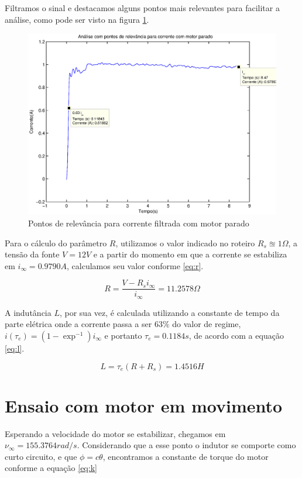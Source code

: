 \documentclass{article}
\begin{document}
Filtramos o sinal e destacamos alguns pontos mais relevantes para facilitar a análise, como pode ser visto na figura \ref{fig:riseI}.
\begin{figure}[H]
	\centering
	\includegraphics[width=0.8\linewidth]{../riseI}
	\caption{Pontos de relevância para corrente filtrada com motor parado}
	\label{fig:riseI}
\end{figure}

Para o cálculo do parâmetro $R$, utilizamos o valor indicado no roteiro\cite{bb:roteiro} $R_s\approxeq1 \Omega$, a tensão da fonte $V=12 V$ e a partir do momento em que a corrente se estabiliza em $i_\infty=0.9790 A$, calculamos seu valor conforme \ref{eq:r}.

\begin{equation}
\label{eq:r}
R = \frac{V-R_si_\infty}{i_\infty}=11.2578\Omega
\end{equation}

A indutância $L$, por sua vez, é calculada utilizando a constante de tempo da parte elétrica onde a corrente passa a ser $63\%$ do valor de regime, $i(\tau_e)=(1-\exp^{-1})i_\infty$ e portanto
$\tau_e=0.1184s$, de acordo com a equação \ref{eq:l}.

\begin{equation}
\label{eq:l}
L = \tau_e(R+R_s)=1.4516H
\end{equation}

\section{Ensaio com motor em movimento}
Esperando a velocidade do motor se estabilizar, chegamos em $\nu_{\infty}=155.3764rad/s$. Considerando que a esse ponto o indutor se comporte como curto circuito, e que $\phi=c\theta$, encontramos a constante de torque do motor conforme a equação \ref{eq:k}
\end{document}
